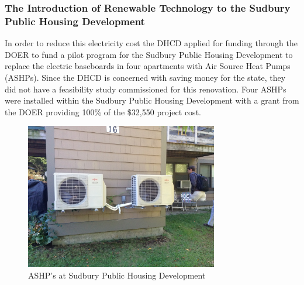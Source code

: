 \subsubsection{The Introduction of Renewable Technology to the Sudbury Public Housing Development}
\par In order to reduce this electricity cost the DHCD applied for funding through the DOER to fund a pilot program for the Sudbury Public Housing Development to replace the electric baseboards in four apartments with Air Source Heat Pumps (ASHPs). Since the DHCD is concerned with saving money for the state, they did not have a feasibility study commissioned for this renovation. Four ASHPs were installed within the Sudbury Public Housing Development with a grant from the DOER providing 100\% of the \$32,550 project cost.
\begin{figure}[H]
\centering
\includegraphics[width=0.75\textwidth]{findingschapter/sudburyoutsideunits}
\caption{ASHP’s at Sudbury Public Housing Development}
\end{figure}

